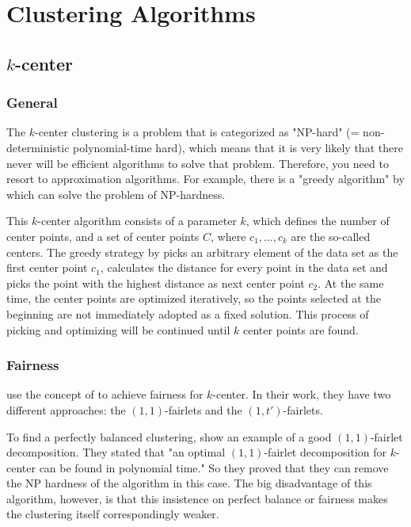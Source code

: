 \section{Clustering Algorithms}
\label{clustering-algorithms}


\subsection{$k$-center}
\label{k-center}

\subsubsection{General}
The $k$-center clustering is a problem that is categorized as "NP-hard" (= non-deterministic polynomial-time hard), which means that it is very likely that there never will be efficient algorithms to solve that problem. Therefore, you need to resort to approximation algorithms.
For example, there is a "greedy algorithm" by \textcite[]{Gonzalez1985ClusteringDistance} which can solve the problem of NP-hardness.

This $k$-center algorithm consists of a parameter $k$, which defines the number of center points, and a set of center points $C$, where $c_{1},...,c_{k}$ are the so-called centers. \autocite[]{Kleindessner2019FairSummarization}
The greedy strategy by \textcite[]{Gonzalez1985ClusteringDistance} picks an arbitrary element of the data set as the first center point $c_{1}$, calculates the distance for every point in the data set and picks the point with the highest distance as next center point $c_{2}$. At the same time, the center points are optimized iteratively, so the points selected at the beginning are not immediately adopted as a fixed solution. This process of picking and optimizing will be continued until $k$ center points are found.

\subsubsection{Fairness}

\textcite[]{Chierichetti2018} use the concept of  to achieve fairness for $k$-center. In their work, they have two different approaches: the $(1,1)$-fairlets and the $(1,t')$-fairlets.

To find a perfectly balanced clustering, \textcite[]{Chierichetti2018} show an example of a good $(1, 1)$-fairlet decomposition. They stated that "an optimal $(1, 1)$-fairlet decomposition for $k$-center can be found in polynomial time." \autocite[6]{Chierichetti2018} So they proved that they can remove the NP hardness of the algorithm in this case. The big disadvantage of this algorithm, however, is that this insistence on perfect balance or fairness makes the clustering itself correspondingly weaker.

